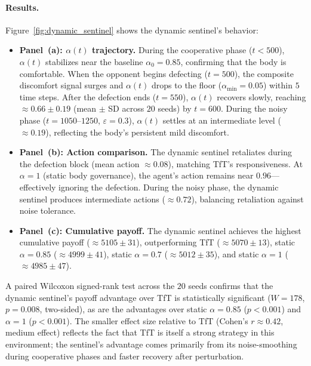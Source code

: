 \documentclass[11pt,a4paper]{article}
\theoremstyle{definition}
\begin{document}
\paragraph{Results.}
Figure~\ref{fig:dynamic_sentinel} shows the dynamic sentinel's behavior:
\begin{itemize}[nosep]
  \item \textbf{Panel~(a): $\alpha(t)$ trajectory.}
    During the cooperative phase ($t < 500$), $\alpha(t)$ stabilizes near the
    baseline $\alpha_0 = 0.85$, confirming that the body is comfortable.
    When the opponent begins defecting ($t = 500$), the composite discomfort
    signal surges and $\alpha(t)$ drops to the floor ($\alpha_{\min} = 0.05$)
    within $5$ time steps.  After the defection ends ($t = 550$),
    $\alpha(t)$ recovers slowly, reaching $\approx 0.66 \pm 0.19$ (mean $\pm$ SD across $20$ seeds) by $t = 600$.
    During the noisy phase ($t = 1050$--$1250$, $\varepsilon = 0.3$),
    $\alpha(t)$ settles at an intermediate level ($\approx 0.19$), reflecting
    the body's persistent mild discomfort.

  \item \textbf{Panel~(b): Action comparison.}
    The dynamic sentinel retaliates during the defection block (mean
    action $\approx 0.08$), matching TfT's responsiveness.
    At $\alpha = 1$ (static body governance), the agent's action remains
    near $0.96$---effectively ignoring the defection.
    During the noisy phase, the dynamic sentinel produces intermediate
    actions ($\approx 0.72$), balancing retaliation against noise
    tolerance.

  \item \textbf{Panel~(c): Cumulative payoff.}
    The dynamic sentinel achieves the highest cumulative payoff
    ($\approx 5105 \pm 31$), outperforming TfT ($\approx 5070 \pm 13$),
    static $\alpha = 0.85$ ($\approx 4999 \pm 41$),
    static $\alpha = 0.7$ ($\approx 5012 \pm 35$),
    and static $\alpha = 1$ ($\approx 4985 \pm 47$).
\end{itemize}
A paired Wilcoxon signed-rank test across the $20$ seeds confirms that
the dynamic sentinel's payoff advantage over TfT is statistically significant
($W = 178$, $p = 0.008$, two-sided), as are the advantages over
static $\alpha = 0.85$ ($p < 0.001$) and $\alpha = 1$ ($p < 0.001$).
The smaller effect size relative to TfT (Cohen's $r \approx 0.42$,
medium effect) reflects the fact that TfT is itself a strong strategy
in this environment; the sentinel's advantage comes primarily from its
noise-smoothing during cooperative phases and faster recovery after
perturbation.
\end{document}
